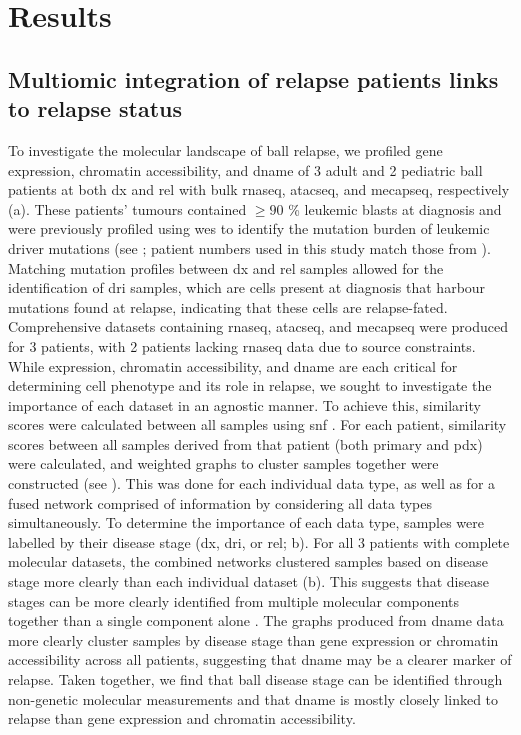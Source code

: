 \section{Results}

\subsection{Multiomic integration of  relapse patients links  to relapse status}

To investigate the molecular landscape of \gls{ball} relapse, we profiled gene expression, chromatin accessibility, and \gls{dname} of 3 adult and 2 pediatric \gls{ball} patients at both \gls{dx} and \gls{rel} with bulk \gls{rnaseq}, \gls{atacseq}, and \gls{mecapseq}, respectively (a).
These patients' tumours contained $\ge 90$ \% leukemic blasts at diagnosis and were previously profiled using \gls{wes} to identify the mutation burden of leukemic driver mutations \cite{dobsonRelapseFatedLatentDiagnosis2020} (see ; patient numbers used in this study match those from \cite[REF][]{dobsonRelapseFatedLatentDiagnosis2020}).
Matching mutation profiles between \gls{dx} and \gls{rel} samples allowed for the identification of \gls{dri} samples, which are cells present at diagnosis that harbour mutations found at relapse, indicating that these cells are relapse-fated.
Comprehensive datasets containing \gls{rnaseq}, \gls{atacseq}, and \gls{mecapseq} were produced for 3 patients, with 2 patients lacking \gls{rnaseq} data due to source constraints.
While expression, chromatin accessibility, and \gls{dname} are each critical for determining cell phenotype and its role in relapse, we sought to investigate the importance of each dataset in an agnostic manner.
To achieve this, similarity scores were calculated between all samples using \gls{snf} \cite{wangSimilarityNetworkFusion2014}.
For each patient, similarity scores between all samples derived from that patient (both primary and \gls{pdx}) were calculated, and weighted graphs to cluster samples together were constructed (see ).
This was done for each individual data type, as well as for a fused network comprised of information by considering all data types simultaneously.
To determine the importance of each data type, samples were labelled by their disease stage (\gls{dx}, \gls{dri}, or \gls{rel}; b).
For all 3 patients with complete molecular datasets, the combined networks clustered samples based on disease stage more clearly than each individual dataset (b).
This suggests that disease stages can be more clearly identified from multiple molecular components together than a single component alone \cite{wangSimilarityNetworkFusion2014}.
The graphs produced from \gls{dname} data more clearly cluster samples by disease stage than gene expression or chromatin accessibility across all patients, suggesting that \gls{dname} may be a clearer marker of relapse.
Taken together, we find that \gls{ball} disease stage can be identified through non-genetic molecular measurements and that \gls{dname} is mostly closely linked to relapse than gene expression and chromatin accessibility.

